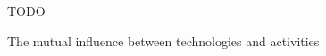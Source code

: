 \begin{figure}
  \centering
  TODO
  \caption[Mutual influence between technologies and activities]{The mutual influence between technologies and activities \cite[p. 26]{benyon_14}}
  \label{fig:activities_and_technologies}
\end{figure}
